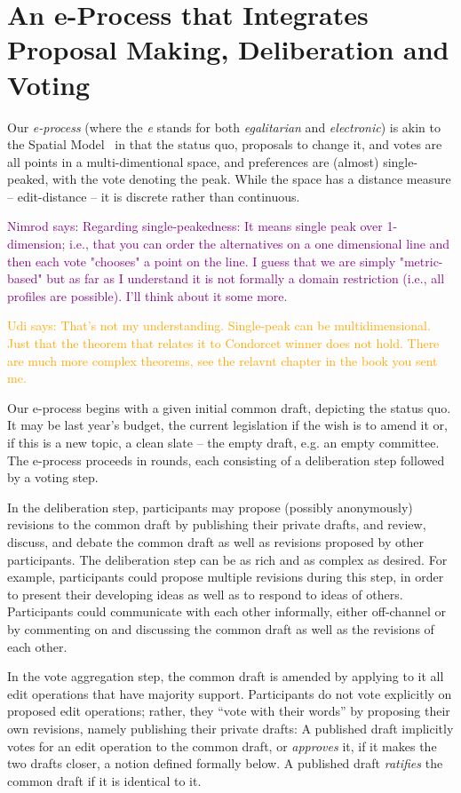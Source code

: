 \documentclass[sigconf]{aamas}  %
\newcommand{\nimrod}[1]{\textcolor{purple}{Nimrod says: #1}}
\newcommand{\udi}[1]{\textcolor{orange}{Udi says: #1}}
\begin{document}
\section{An e-Process that Integrates Proposal Making, Deliberation and Voting}\label{section:our process}

Our \emph{e-process} (where the \emph{e} stands for both \emph{egalitarian} and \emph{electronic}) is akin to the Spatial Model~\cite{SpatialModel} in that the status quo, proposals to change it, and votes are all points in a multi-dimentional space, and preferences  are (almost) single-peaked, with the vote denoting the peak.  While the space has a distance measure -- edit-distance -- it is discrete rather than continuous.

\nimrod{Regarding single-peakedness: It means single peak over 1-dimension; i.e., that you can order the alternatives on a one dimensional line and then each vote "chooses" a point on the line. I guess that we are simply "metric-based" but as far as I understand it is not formally a domain restriction (i.e., all profiles are possible). I'll think about it some more.}

\udi{That's not my understanding.  Single-peak can be multidimensional.  Just that the theorem that relates it to Condorcet winner does not hold. 
There are much more complex theorems, see the relavnt chapter in the book you sent me.}

Our e-process begins with a given initial common draft, depicting the status quo.  It may be last year's budget, the current legislation if the wish is to amend it or, if this is a new topic, a clean slate -- the empty draft, e.g. an  empty committee.  The e-process proceeds in rounds, each consisting of a deliberation step followed by a voting step. 

In the deliberation step,
participants may propose (possibly anonymously) revisions to the common draft by publishing their private drafts,  and review, discuss, and debate the common draft as well as revisions proposed by other participants. The deliberation step can be as rich and as complex as desired. For example, participants could propose multiple revisions during this step, in order to present their developing ideas as well as to respond to ideas of others. Participants could communicate with each other informally, either off-channel or by commenting on and discussing the common draft as well as the revisions of each other. 

In the vote aggregation step, the common draft is amended by applying to it all edit operations that have majority support. Participants do not vote explicitly on proposed edit operations; rather, they ``vote with their words'' by proposing their own revisions, namely publishing their private drafts:  A published draft implicitly votes for an edit operation to the common draft, or \emph{approves} it, if it makes the two drafts closer, a notion defined formally below.  A published draft \emph{ratifies} the common draft if it is identical to it.
\end{document}
